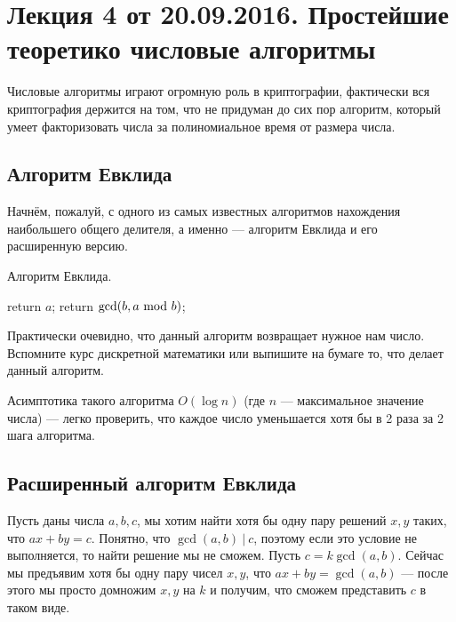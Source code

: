 \documentclass[a4paper, 12pt]{article}
\begin{document}
\pagestyle{fancy}

\section{Лекция 4 от 20.09.2016. Простейшие теоретико числовые алгоритмы}

Числовые алгоритмы играют огромную роль в криптографии, фактически вся криптография
держится на том, что не придуман до сих пор алгоритм, который умеет факторизовать числа за
полиномиальное время от размера числа.

\subsection{Алгоритм Евклида}

Начнём, пожалуй, с одного из самых известных алгоритмов нахождения наибольшего
общего делителя, а именно --- алгоритм Евклида и его расширенную версию.

\begin{algorithm}
  \caption{Алгоритм Евклида.}
  \begin{algorithmic}[1]
        \State return $a$;
      \Else
        \State return $\gcd(b, a \ \text{mod} \  b)$;
      \EndIf
    \EndFunction
  \end{algorithmic}
\end{algorithm}

Практически очевидно, что данный алгоритм возвращает нужное нам число.
Вспомните курс дискретной математики или выпишите на бумаге то,
что делает данный алгоритм. 

Асимптотика такого алгоритма $O(\log n)$ (где $n$ --- максимальное значение числа)
--- легко проверить, что каждое число уменьшается хотя бы в 2 раза за 2 шага алгоритма.

\subsection{Расширенный алгоритм Евклида}

Пусть даны числа $a, b, c$, мы хотим найти хотя бы одну пару решений $x, y$ таких,
что $ax + by = c$. Понятно, что $\gcd(a, b) \ | \ c$, поэтому если это условие
не выполняется, то найти решение мы не сможем. Пусть $c = k \gcd(a, b)$. Сейчас
мы предъявим хотя бы одну пару чисел $x, y$, что $ax + by = \gcd(a, b)$ --- после этого
мы просто домножим $x, y$ на $k$ и получим, что сможем представить $c$ в таком
виде.
\end{document}
